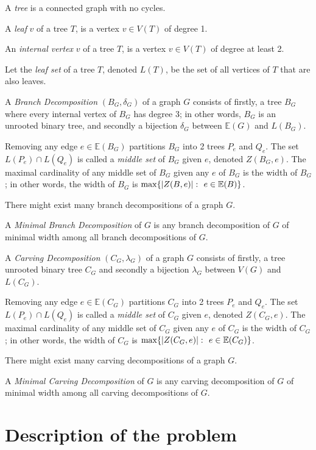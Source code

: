 \documentclass{article}
\begin{document}
	A \textit{tree} is a connected graph with no cycles.

	A \textit{leaf} $v$ of a tree $T$, is a vertex $v \in V(T)$ of degree 1.

	An \textit{internal vertex} $v$ of a tree $T$, is a vertex $v \in V(T)$ of degree at least 2.

	Let the \textit{leaf set} of a tree $T$, denoted $L(T)$, be the set of all vertices of $T$ that are also leaves.

	A \textit{Branch Decomposition} $(B_G, \delta_G)$ of a graph $G$ consists of firstly, a tree $B_G$ where every internal vertex of $B_G$ has degree 3; in other words, $B_G$ is an unrooted binary tree, and secondly a bijection $\delta_G$ between $\mathbb{E}(G)$ and $L(B_G)$.

	Removing any edge $e \in \mathbb{E}(B_G)$ partitions $B_G$ into 2 trees $P_e$ and $Q_e$. The set $L(P_e) \cap L(Q_e)$ is called a \textit{middle set} of $B_G$ given $e$, denoted $Z(B_G,e)$. The maximal cardinality of any middle set of $B_G$ given any $e$ of $B_G$ is the width of $B_G$; in other words, the width of $B_G$ is $\max\{ |Z(B, e)| \,\colon\  e \in \mathbb{E}(B) \}$.

	There might exist many branch decompositions of a graph $G$.

	A \textit{Minimal Branch Decomposition} of $G$ is any branch decomposition of $G$ of minimal width among all branch decompositions of $G$.

	A \textit{Carving Decomposition} $(C_G, \lambda_G)$ of a graph $G$ consists of firstly, a tree unrooted binary tree $C_G$ and secondly a bijection $\lambda_G$ between $V(G)$ and $L(C_G)$.

	Removing any edge $e \in \mathbb{E}(C_G)$ partitions $C_G$ into 2 trees $P_e$ and $Q_e$. The set $L(P_e) \cap L(Q_e)$ is called a \textit{middle set} of $C_G$ given $e$, denoted $Z(C_G,e)$. The maximal cardinality of any middle set of $C_G$ given any $e$ of $C_G$ is the width of $C_G$; in other words, the width of $C_G$ is $\max\{ |Z(C_G, e)| \,\colon\  e \in \mathbb{E}(C_G) \}$.

	There might exist many carving decompositions of a graph $G$.

	A \textit{Minimal Carving Decomposition} of $G$ is any carving decomposition of $G$ of minimal width among all carving decompositions of $G$.

\section{Description of the problem}
\end{document}
